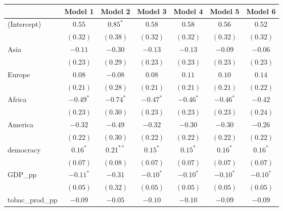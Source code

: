 
\begin{table}[!h]
\begin{center}
\begin{tabular}{l c c c c c c }
\toprule
 & Model 1 & Model 2 & Model 3 & Model 4 & Model 5 & Model 6 \\
\midrule
(Intercept)             & $0.55$       & $0.85^{*}$   & $0.58$       & $0.58$       & $0.56$       & $0.52$       \\
                        & $(0.32)$     & $(0.38)$     & $(0.32)$     & $(0.32)$     & $(0.32)$     & $(0.32)$     \\
Asia                    & $-0.11$      & $-0.30$      & $-0.13$      & $-0.13$      & $-0.09$      & $-0.06$      \\
                        & $(0.23)$     & $(0.29)$     & $(0.23)$     & $(0.23)$     & $(0.23)$     & $(0.23)$     \\
Europe                  & $0.08$       & $-0.08$      & $0.08$       & $0.11$       & $0.10$       & $0.14$       \\
                        & $(0.21)$     & $(0.28)$     & $(0.21)$     & $(0.21)$     & $(0.21)$     & $(0.22)$     \\
Africa                  & $-0.49^{*}$  & $-0.74^{*}$  & $-0.47^{*}$  & $-0.46^{*}$  & $-0.46^{*}$  & $-0.42$      \\
                        & $(0.23)$     & $(0.30)$     & $(0.23)$     & $(0.23)$     & $(0.23)$     & $(0.24)$     \\
America                 & $-0.32$      & $-0.49$      & $-0.32$      & $-0.30$      & $-0.30$      & $-0.26$      \\
                        & $(0.22)$     & $(0.30)$     & $(0.22)$     & $(0.22)$     & $(0.22)$     & $(0.22)$     \\
democracy               & $0.16^{*}$   & $0.21^{**}$  & $0.15^{*}$   & $0.15^{*}$   & $0.16^{*}$   & $0.16^{*}$   \\
                        & $(0.07)$     & $(0.08)$     & $(0.07)$     & $(0.07)$     & $(0.07)$     & $(0.07)$     \\
GDP\_pp                 & $-0.11^{*}$  & $-0.31$      & $-0.10^{*}$  & $-0.10^{*}$  & $-0.10^{*}$  & $-0.10^{*}$  \\
                        & $(0.05)$     & $(0.32)$     & $(0.05)$     & $(0.05)$     & $(0.05)$     & $(0.05)$     \\
tobac\_prod\_pp         & $-0.09$      & $-0.05$      & $-0.10$      & $-0.10$      & $-0.09$      & $-0.09$      \\

\end{tabular}
\end{center}
\end{table}
